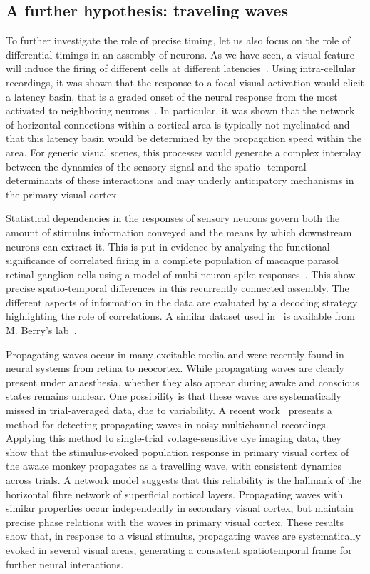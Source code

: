 \documentclass[brainsci, %
               review,submit,pdftex,moreauthors%
               ]{Definitions/mdpi}
\begin{document}
\subsection{A further hypothesis: traveling waves}
To further investigate the role of precise timing, let us also focus on the role of differential timings in an assembly of neurons. As we have seen, a visual feature will induce the firing of different cells at different latencies~\citep{celebrini_dynamics_1993}. Using intra-cellular recordings, it was shown that the response to a focal visual activation would elicit a latency basin, that is a graded onset of the neural response from the most activated to neighboring neurons~\citep{bringuier_horizontal_1999}. In particular, it was shown that the network of horizontal connections within a cortical area is typically not myelinated and that this latency basin would be determined by the propagation speed within the area. For generic visual scenes, this processes would generate a complex interplay between the dynamics of the sensory signal and the spatio- temporal determinants of these interactions and may underly anticipatory mechanisms in the primary visual cortex~\citep{benvenuti_anticipatory_2020,le_bec_horizontal_2022}.

Statistical dependencies in the responses of sensory neurons govern both the amount of stimulus information conveyed and the means by which downstream neurons can extract it. This is put in evidence by analysing the functional significance of correlated firing in a complete population of macaque parasol retinal ganglion cells using a model of multi-neuron spike responses~\citep{pillow_spatio-temporal_2008}. This show precise spatio-temporal differences in this recurrently connected assembly. The different aspects of information in the data are evaluated by a decoding strategy highlighting the role of correlations. A similar dataset used in~\citep{schneidman_weak_2006} is available from M. Berry's lab~\citep{berry_spike_2022}.

Propagating waves occur in many excitable media and were recently found in neural systems from retina to neocortex. While propagating waves are clearly present under anaesthesia, whether they also appear during awake and conscious states remains unclear. One possibility is that these waves are systematically missed in trial-averaged data, due to variability. A recent work~\citep{muller_stimulus-evoked_2014} presents a method for detecting propagating waves in noisy multichannel recordings. Applying this method to single-trial voltage-sensitive dye imaging data, they show that the stimulus-evoked population response in primary visual cortex of the awake monkey propagates as a travelling wave, with consistent dynamics across trials. A network model suggests that this reliability is the hallmark of the horizontal fibre network of superficial cortical layers. Propagating waves with similar properties occur independently in secondary visual cortex, but maintain precise phase relations with the waves in primary visual cortex. These results show that, in response to a visual stimulus, propagating waves are systematically evoked in several visual areas, generating a consistent spatiotemporal frame for further neural interactions.
\end{document}
